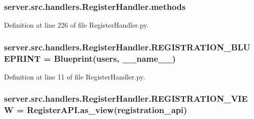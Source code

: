 \subsubsection[{\texorpdfstring{methods}{methods}}]{\setlength{\rightskip}{0pt plus 5cm}server.\+src.\+handlers.\+Register\+Handler.\+methods}\hypertarget{namespaceserver_1_1src_1_1handlers_1_1_register_handler_a1ef2f67e4e22f57354c300ef05faa2d2}{}\label{namespaceserver_1_1src_1_1handlers_1_1_register_handler_a1ef2f67e4e22f57354c300ef05faa2d2}


Definition at line 226 of file Register\+Handler.\+py.

\subsubsection[{\texorpdfstring{R\+E\+G\+I\+S\+T\+R\+A\+T\+I\+O\+N\+\_\+\+B\+L\+U\+E\+P\+R\+I\+NT}{REGISTRATION_BLUEPRINT}}]{\setlength{\rightskip}{0pt plus 5cm}server.\+src.\+handlers.\+Register\+Handler.\+R\+E\+G\+I\+S\+T\+R\+A\+T\+I\+O\+N\+\_\+\+B\+L\+U\+E\+P\+R\+I\+NT = Blueprint(\textquotesingle{}users\textquotesingle{}, \+\_\+\+\_\+name\+\_\+\+\_\+)}\hypertarget{namespaceserver_1_1src_1_1handlers_1_1_register_handler_a5038917ac0cc3bdfeb7e0ae890fb0ab3}{}\label{namespaceserver_1_1src_1_1handlers_1_1_register_handler_a5038917ac0cc3bdfeb7e0ae890fb0ab3}


Definition at line 11 of file Register\+Handler.\+py.

\subsubsection[{\texorpdfstring{R\+E\+G\+I\+S\+T\+R\+A\+T\+I\+O\+N\+\_\+\+V\+I\+EW}{REGISTRATION_VIEW}}]{\setlength{\rightskip}{0pt plus 5cm}server.\+src.\+handlers.\+Register\+Handler.\+R\+E\+G\+I\+S\+T\+R\+A\+T\+I\+O\+N\+\_\+\+V\+I\+EW = Register\+A\+P\+I.\+as\+\_\+view(\textquotesingle{}registration\+\_\+api\textquotesingle{})}\hypertarget{namespaceserver_1_1src_1_1handlers_1_1_register_handler_a02027a84f6d45f7537fef8a6bbe74e9e}{}\label{namespaceserver_1_1src_1_1handlers_1_1_register_handler_a02027a84f6d45f7537fef8a6bbe74e9e}


